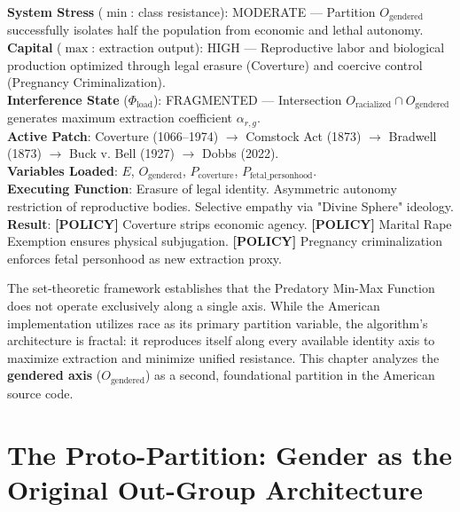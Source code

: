 \documentclass[12pt,openany]{book}
\begin{document}
\begin{tcolorbox}[colback=black!5, colframe=black!70, fonttitle=\bfseries\ttfamily, title=RUNTIME LOG: GENDERED AXIS (FOUNDATIONAL -- PRESENT)]
\ttfamily\small
\textbf{System Stress} ($\min$: class resistance): MODERATE --- Partition $O_{\text{gendered}}$ successfully isolates half the population from economic and lethal autonomy.\\
\textbf{Capital} ($\max$: extraction output): HIGH --- Reproductive labor and biological production optimized through legal erasure (Coverture) and coercive control (Pregnancy Criminalization).\\
\textbf{Interference State} ($\Phi_{\text{load}}$): FRAGMENTED --- Intersection $O_{\text{racialized}} \cap O_{\text{gendered}}$ generates maximum extraction coefficient $\alpha_{r,g}$.\\
\textbf{Active Patch}: Coverture (1066--1974) $\rightarrow$ Comstock Act (1873) $\rightarrow$ Bradwell (1873) $\rightarrow$ Buck v. Bell (1927) $\rightarrow$ Dobbs (2022).\\
\textbf{Variables Loaded}: $E$, $O_{\text{gendered}}$, $P_{\text{coverture}}$, $P_{\text{fetal\_personhood}}$.\\
\textbf{Executing Function}: Erasure of legal identity. Asymmetric autonomy restriction of reproductive bodies. Selective empathy via "Divine Sphere" ideology.\\
\textbf{Result}: \textbf{[POLICY]} Coverture strips economic agency. \textbf{[POLICY]} Marital Rape Exemption ensures physical subjugation. \textbf{[POLICY]} Pregnancy criminalization enforces fetal personhood as new extraction proxy.
\end{tcolorbox}

\medskip

The set-theoretic framework establishes that the Predatory Min-Max Function does not operate exclusively along a single axis. While the American implementation utilizes race as its primary partition variable, the algorithm's architecture is fractal: it reproduces itself along every available identity axis to maximize extraction and minimize unified resistance. This chapter analyzes the \textbf{gendered axis} ($O_{\text{gendered}}$) as a second, foundational partition in the American source code.

\section{The Proto-Partition: Gender as the Original Out-Group Architecture}
\end{document}
